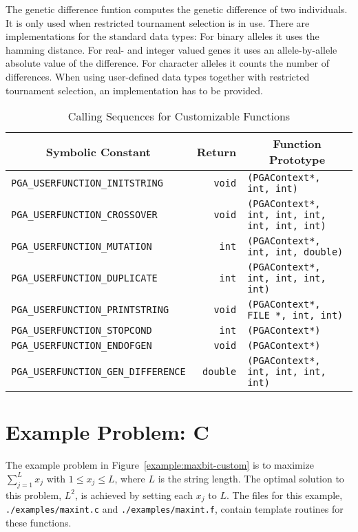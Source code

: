\documentclass{report}
\begin{document}
The genetic difference funtion\label{gendiff} computes the genetic
difference of two individuals. It is only used when restricted
tournament selection is in use. There are implementations for the
standard data types: For binary alleles it uses the hamming distance.
For real- and integer valued genes it uses an allele-by-allele absolute
value of the difference. For character alleles it counts the number of
differences. When using user-defined data types together with restricted
tournament selection, an implementation has to be provided.


\begin{table}
\centering
\caption
{
Calling Sequences for Customizable Functions\label{tab:custom-functions}
}
\begin{tabular}{|l|r|l|} \hline\hline
\multicolumn{1}{|c|}{Symbolic Constant} &
\multicolumn{1}{|c|}{Return} &
\multicolumn{1}{c|}{Function Prototype} \\ \hline
\verb+PGA_USERFUNCTION_INITSTRING+     &\verb+void+   &
    \verb+(PGAContext*, int, int)+ \\
\verb+PGA_USERFUNCTION_CROSSOVER+      &\verb+void+   &
    \verb+(PGAContext*, int, int, int, int, int, int)+ \\
\verb+PGA_USERFUNCTION_MUTATION+       &\verb+int+    &
    \verb+(PGAContext*, int, int, double)+ \\
\verb+PGA_USERFUNCTION_DUPLICATE+      &\verb+int+    &
    \verb+(PGAContext*, int, int, int, int)+ \\
\verb+PGA_USERFUNCTION_PRINTSTRING+    &\verb+void+   &
    \verb+(PGAContext*, FILE *, int, int)+ \\
\verb+PGA_USERFUNCTION_STOPCOND+       &\verb+int+    &
    \verb+(PGAContext*)+ \\
\verb+PGA_USERFUNCTION_ENDOFGEN+       &\verb+void+   &
    \verb+(PGAContext*)+ \\
\verb+PGA_USERFUNCTION_GEN_DIFFERENCE+ &\verb+double+ &
    \verb+(PGAContext*, int, int, int, int)+ \\
\hline
\end{tabular}
\end{table}


\section{Example Problem: C}

The example problem in Figure~\ref{example:maxbit-custom} is to maximize
$\sum_{j=1}^{L} x_{j}$ with $1 \leq x_j \leq L$, where $L$ is the string
length.  The optimal solution to this problem, $L^2$, is achieved by setting
each $x_j$ to $L$.  The files for this example, {\tt ./examples/maxint.c}
and {\tt ./examples/maxint.f}, contain template routines for these functions.
\end{document}
